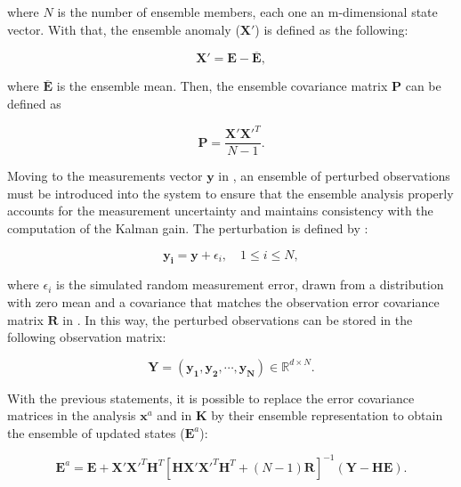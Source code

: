 \noindent where $N$ is the number of ensemble members, each one an m-dimensional state vector. With that, the ensemble anomaly ($\mathbf{X'}$) is defined as the following:

\begin{equation}\label{eq:cp2_anomaly}
	\mathbf{X'}=\mathbf{E}-\overline{\mathbf{E}},
\end{equation}

\noindent where $\overline{\mathbf{E}}$ is the ensemble mean. Then, the ensemble covariance matrix $\mathbf{P}$ can be defined as

\begin{equation}\label{eq:cp2_encov}
	\mathbf{P}=\frac{\mathbf{X'X'}^{T}}{N-1}.
\end{equation}

Moving to the measurements vector $\mathbf{y}$ in , an ensemble of perturbed observations must be introduced into the system to ensure that the ensemble analysis properly accounts for the measurement uncertainty and maintains consistency with the computation of the Kalman gain. The perturbation is defined by :

\begin{equation}\label{eq:cp2_enobs}
	\mathbf{y_i}=\mathbf{y}+\epsilon_i, \quad 1\leq i\leq N,
\end{equation}

\noindent where $\epsilon_i$ is the simulated random measurement error, drawn from a distribution with zero mean and a covariance that matches the observation error covariance matrix $\mathbf{R}$ in . In this way, the perturbed observations can be stored in the following observation matrix:

\begin{equation}\label{eq:cp2_obspertub}
    \mathbf{Y}=\left( \mathbf{y_1},\mathbf{y_2},\cdots,\mathbf{y_N} \right)\in\mathbb{R}^{d\times N}.
\end{equation}

With the previous statements, it is possible to replace the error covariance matrices in the analysis $\mathbf{x}^a$ and in $\mathbf{K}$ by their ensemble representation to obtain the ensemble of updated states ($\mathbf{E}^a$):

\begin{equation}\label{eq:cp2_enkf}
    \mathbf{E}^a=\mathbf{E} + \mathbf{X'X'}^T \mathbf{H}^T \left[ \mathbf{HX'X'}^T \mathbf{H}^T +(N-1) \mathbf{R}\right]^{-1} \left( \mathbf{Y}-\mathbf{HE} \right).
\end{equation}

